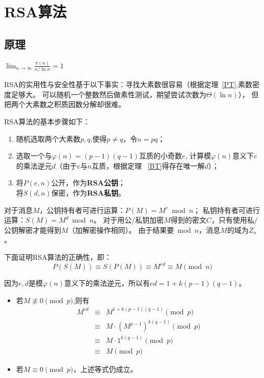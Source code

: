 \section{RSA算法}
\subsection{原理}
\begin{theorem}[素数定理]\label{PT}
	$\displaystyle \lim_{n\rightarrow\infty}\frac{\pi(n)}{n/\ln n}=1$
\end{theorem}
RSA的实用性与安全性基于以下事实：寻找大素数很容易（根据定理~\ref{PT},素数密度足够大。
可以随机一个整数然后做素性测试，期望尝试次数为$\Theta(\ln n)$），
但把两个大素数之积质因数分解却很难。

RSA算法的基本步骤如下：
\begin{enumerate}
	\item 随机选取两个大素数$p,q$,使得$p\neq q$，令$n=pq$；
	\item 选取一个与$\varphi(n)=(p-1)(q-1)$互质的小奇数$e$,
	      计算模$\varphi(n)$意义下$e$的乘法逆元$d$（由于$e$与$n$互质，根据定理
	      ~\ref{BT}得存在唯一解$d$）；
	\item 将$P(e,n)$公开，作为{\bfseries RSA公钥}；\\
	      将$S(d,n)$保密，作为{\bfseries RSA私钥}。
\end{enumerate}

对于消息$M$，公钥持有者可进行运算：$P(M)=M^e \bmod n$；
私钥持有者可进行运算：$S(M)=M^d \bmod n$。
对于用公/私钥加密$M$得到的密文$C$，只有使用私/公钥解密才能得到$M$（加解密操作相同）。
由于结果要$\bmod n$，消息$M$的域为$Z_n$。

下面证明RSA算法的正确性，即：
\begin{displaymath}
	P(S(M))\equiv S(P(M))\equiv M^{ed}\equiv M \pmod{n}
\end{displaymath}

因为$e,d$是模$\varphi(n)$意义下的乘法逆元，所以有$ed=1+k(p-1)(q-1)$。

\begin{itemize}
	\item 若$M\not\equiv 0 \pmod{p}$,则有
	      \begin{eqnarray*}
		      M^{ed}&\equiv& M^{1+k(p-1)(q-1)} \pmod{p}\\
		      &\equiv& M\cdot (M^{p-1})^{k(q-1)} \pmod{p}\\
		      &\equiv& M\cdot 1^{k(q-1)} \pmod{p}\\
		      &\equiv& M \pmod{p}
	      \end{eqnarray*}
	\item 若$M\equiv 0 \pmod{p}$，上述等式仍成立。
\end{itemize}

